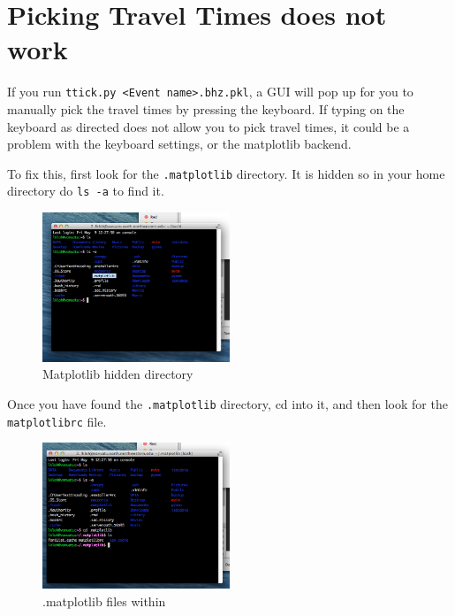 \documentclass[letterpaper,10pt]{article}
\begin{document}

\section{Picking Travel Times does not work}

If you run \verb"ttick.py <Event name>.bhz.pkl", a GUI will pop up for you to manually pick the travel times by pressing the keyboard. If typing on the keyboard as directed does not allow you to pick travel times, it could be a problem with the keyboard settings, or the matplotlib backend. 

To fix this, first look for the \verb".matplotlib" directory. It is hidden so in your home directory do \verb"ls -a" to find it.

\begin{figure}[h!]
  \centering
  \includegraphics[width=0.5\textwidth]{images/matplotlib_hidden_directory}
  \caption{Matplotlib hidden directory}
  \label{fig:matplotlib_hidden_directory}
\end{figure}

Once you have found the \verb".matplotlib" directory, cd into it, and then look for the \verb"matplotlibrc" file. 

\begin{figure}[h!]
  \centering
  \includegraphics[width=0.5\textwidth]{images/files_in_matplotlib}
  \caption{.matplotlib files within}
  \label{fig:files_in_matplotlib}
\end{figure}
\end{document}
